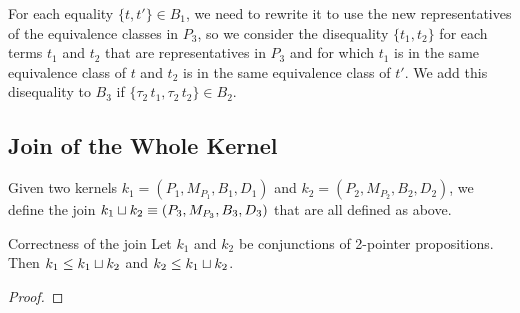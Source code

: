 For each equality $\{t, t'\} \in B_1$,
we need to rewrite it to use the new representatives of the equivalence classes in $P_3$,
so we consider the disequality $\{t_1, t_2\}$
for each terms $t_1$ and $t_2$ that are representatives in $P_3$ and for
which $t_1$ is in the same equivalence class of $t$ and $t_2$ is in the same equivalence class of $t'$.
We add this disequality to $B_3$ if $\{\tau_2\,t_1, \tau_2\,t_2\} \in B_2$.

\subsection{Join of the Whole Kernel}

Given two kernels $k_1 = (P_1, M_{P_1},B_1, D_1)$ and $k_2 = (P_2, M_{P_2},B_2, D_2)$, we define the join $k_1 \sqcup k_2 \equiv (P_3, M_{P_3},B_3, D_3)$ that are all defined as above.


\begin{proposition}{Correctness of the join}
    Let $k_1$ and $k_2$ be conjunctions of 2-pointer propositions.
    Then $k_1 \leq k_1 \sqcup k_2$ and $k_2 \leq k_1 \sqcup k_2$.
\end{proposition}

\begin{proof}
\end{proof}
